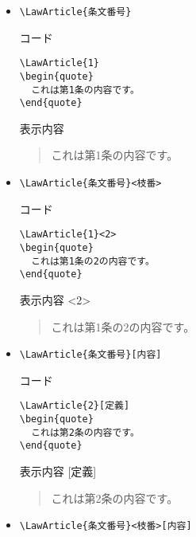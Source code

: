 \documentclass[oneside,10pt,a4paper]{jsarticle}
\begin{document}
  \begin{itemize}
    \item \verb|\LawArticle{条文番号}|
      \begin{itembox}[l]{コード}
        {\footnotesize\begin{verbatim}
\LawArticle{1}
\begin{quote}
  これは第1条の内容です。
\end{quote}\end{verbatim}}
      \end{itembox}
      \begin{itembox}[l]{表示内容}
        \begin{quote}
          これは第1条の内容です。
        \end{quote}
      \end{itembox}
    \item \verb|\LawArticle{条文番号}<枝番>|
      \begin{itembox}[l]{コード}
        {\footnotesize\begin{verbatim}
\LawArticle{1}<2>
\begin{quote}
  これは第1条の2の内容です。
\end{quote}\end{verbatim}}
      \end{itembox}
      \begin{itembox}[l]{表示内容}
        <2>
        \begin{quote}
          これは第1条の2の内容です。
        \end{quote}
      \end{itembox}
    \item \verb|\LawArticle{条文番号}[内容]|
      \begin{itembox}[l]{コード}
        {\footnotesize\begin{verbatim}
\LawArticle{2}[定義]
\begin{quote}
  これは第2条の内容です。
\end{quote}\end{verbatim}}
      \end{itembox}
      \begin{itembox}[l]{表示内容}
        [定義]
        \begin{quote}
          これは第2条の内容です。
        \end{quote}
      \end{itembox}
    \newpage
    \item \verb|\LawArticle{条文番号}<枝番>[内容]|

\end{itemize}
\end{document}

